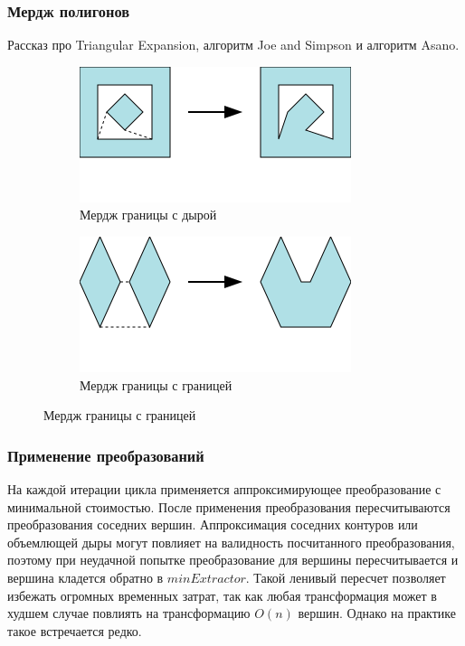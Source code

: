 \documentclass{fefu_thesis/cls/fefu}
\begin{document}
    \subsubsection{Мердж полигонов}
    Рассказ про Triangular Expansion, алгоритм Joe and Simpson и алгоритм Asano.
    \begin{figure}[H]
        \centering
        \begin{subfigure}[t]{\linewidth}
            \centering
            \includegraphics[scale=1]{images/polygonmerge.png}
            \caption{Мердж границы с дырой}
        \end{subfigure}
        \begin{subfigure}[t]{\linewidth}
            \centering
            \includegraphics[scale=1]{images/polygonmerge2.png}
            \caption{Мердж границы с границей}
        \end{subfigure}
    \end{figure}

    \subsubsection{Применение преобразований}
    На каждой итерации цикла применяется аппроксимирующее преобразование с минимальной стоимостью. После применения преобразования пересчитываются преобразования соседних вершин.
    Аппроксимация соседних контуров или объемлющей дыры могут повлияет на валидность посчитанного преобразования, поэтому при неудачной попытке преобразование для вершины пересчитывается и вершина кладется обратно в $minExtractor$. Такой ленивый пересчет позволяет избежать огромных временных затрат, так как любая трансформация может в худшем случае повлиять на трансформацию $O\left(n\right)$ вершин. Однако на практике такое встречается редко.
\end{document}

